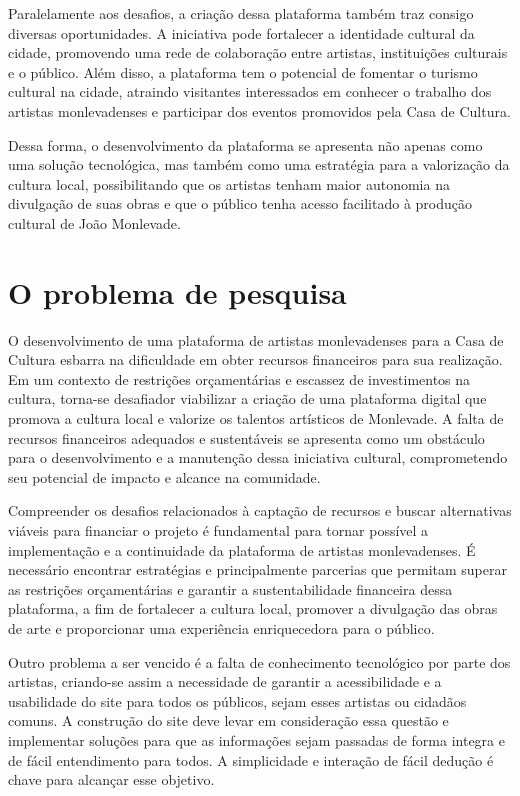 Paralelamente aos desafios, a criação dessa plataforma também traz consigo diversas oportunidades. A iniciativa pode fortalecer a identidade cultural da cidade, promovendo uma rede de colaboração entre artistas, instituições culturais e o público. Além disso, a plataforma tem o potencial de fomentar o turismo cultural na cidade, atraindo visitantes interessados em conhecer o trabalho dos artistas monlevadenses e participar dos eventos promovidos pela Casa de Cultura.

Dessa forma, o desenvolvimento da plataforma se apresenta não apenas como uma solução tecnológica, mas também como uma estratégia para a valorização da cultura local, possibilitando que os artistas tenham maior autonomia na divulgação de suas obras e que o público tenha acesso facilitado à produção cultural de João Monlevade.

\section{O problema de pesquisa}
\label{sec:problema}

O desenvolvimento de uma plataforma de artistas monlevadenses para a Casa de Cultura esbarra na dificuldade em obter recursos financeiros para sua realização. Em um contexto de restrições orçamentárias e escassez de investimentos na cultura, torna-se desafiador viabilizar a criação de uma plataforma digital que promova a cultura local e valorize os talentos artísticos de Monlevade. A falta de recursos financeiros adequados e sustentáveis se apresenta como um obstáculo para o desenvolvimento e a manutenção dessa iniciativa cultural, comprometendo seu potencial de impacto e alcance na comunidade.

Compreender os desafios relacionados à captação de recursos e buscar alternativas viáveis para financiar o projeto é fundamental para tornar possível a implementação e a continuidade da plataforma de artistas monlevadenses. É necessário encontrar estratégias e principalmente parcerias que permitam superar as restrições orçamentárias e garantir a sustentabilidade financeira dessa plataforma, a fim de fortalecer a cultura local, promover a divulgação das obras de arte e proporcionar uma experiência enriquecedora para o público.

Outro problema a ser vencido é a falta de conhecimento tecnológico por parte dos artistas, criando-se assim a necessidade de garantir a acessibilidade e a usabilidade do site para todos os públicos, sejam esses artistas ou cidadãos comuns. A construção do site deve levar em consideração essa questão e implementar soluções para que as informações sejam passadas de forma integra e de fácil entendimento para todos. A simplicidade e interação de fácil dedução é chave para alcançar esse objetivo.

